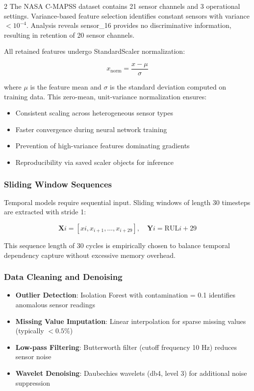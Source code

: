 \documentclass{ijceds} %
\begin{document}
\begin{multicols}{2}
The NASA C-MAPSS dataset contains 21 sensor channels and 3 operational settings. Variance-based feature selection identifies constant sensors with variance $< 10^{-4}$. Analysis reveals sensor\_16 provides no discriminative information, resulting in retention of 20 sensor channels.

All retained features undergo StandardScaler normalization:

\begin{equation}
    x_{\text{norm}} = \frac{x - \mu}{\sigma}
    \label{eq:standardscaler}
\end{equation}

where $\mu$ is the feature mean and $\sigma$ is the standard deviation computed on training data. This zero-mean, unit-variance normalization ensures:

\begin{itemize}
    \item Consistent scaling across heterogeneous sensor types
    \item Faster convergence during neural network training
    \item Prevention of high-variance features dominating gradients
    \item Reproducibility via saved scaler objects for inference
\end{itemize}

\subsubsection{Sliding Window Sequences}

Temporal models require sequential input. Sliding windows of length 30 timesteps are extracted with stride 1:

\begin{equation}
    \mathbf{X}i = [x{i}, x_{i+1}, \ldots, x_{i+29}], \quad \mathbf{Y}i = \text{RUL}{i+29}
    \label{eq:sliding-window}
\end{equation}

This sequence length of 30 cycles is empirically chosen to balance temporal dependency capture without excessive memory overhead.

\subsubsection{Data Cleaning and Denoising}

\begin{itemize}
    \item \textbf{Outlier Detection}: Isolation Forest with contamination = 0.1 identifies anomalous sensor readings
    \item \textbf{Missing Value Imputation}: Linear interpolation for sparse missing values (typically $< 0.5\%$)
    \item \textbf{Low-pass Filtering}: Butterworth filter (cutoff frequency 10 Hz) reduces sensor noise
    \item \textbf{Wavelet Denoising}: Daubechies wavelets (db4, level 3) for additional noise suppression
\end{itemize}


\end{multicols}
\end{document}
